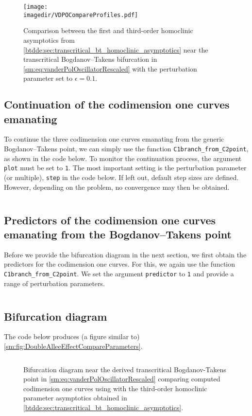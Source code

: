 \begin{figure}[ht]
    \centering
    \texttt{[image: \\imagedir/VDPOCompareProfiles.pdf]}
    \caption{Comparison between the first and third-order homoclinic asymptotics from
    \cref{btdde:sec:transcritical_bt_homoclinic_asymptotics} near the transcritical
        Bogdanov--Takens bifurcation in \cref{sm:eq:vanderPolOscillatorRescaled} with the
        perturbation parameter set to $\epsilon=0.1$.}
    \label{sm:fig:VDPOCompareProfiles}
\end{figure}

\subsection{Continuation of the codimension one curves emanating}
To continue the three codimension one curves emanating from the generic
Bogdanov--Takens point, we can simply use the function
\texttt{C1branch_from_C2point}, as shown in the code below. To monitor the
continuation process, the argument \texttt{plot} must be set to \texttt{1}.
The most important setting is the perturbation parameter (or multiple),
\texttt{step} in the code below. If left out, default step sizes are defined.
However, depending on the problem, no convergence may then be obtained.
\inputminted[firstline=89, lastline=113]{MATLAB}{\pathToDDEBifToolDemos/vdpo_bt_transcritical/vanderPolOscillator.m}

\subsection{Predictors of the codimension one curves emanating from the Bogdanov--Takens point}
Before we provide the bifurcation diagram in the next section, we first obtain the predictors
for the codimension one curves. For this, we again use the function
\texttt{C1branch_from_C2point}. We set the argument \texttt{predictor} to \texttt{1}
and provide a range of perturbation parameters.
\inputminted[firstline=135, lastline=154]{MATLAB}{\pathToDDEBifToolDemos/vdpo_bt_transcritical/vanderPolOscillator.m}

\subsection{Bifurcation diagram}
The code below produces (a figure similar to) \cref{sm:fig:DoubleAlleeEffectCompareParameters}.
\inputminted[firstline=156, lastline=182]{MATLAB}{\pathToDDEBifToolDemos/vdpo_bt_transcritical/vanderPolOscillator.m}
%
\begin{figure}[ht]
    \centering
    \caption{Bifurcation diagram near the derived transcritical Bogdanov-Takens point in
        \cref{sm:eq:vanderPolOscillatorRescaled} comparing computed codimension one curves using
        \DDEBIFTOOL with the third-order homoclinic parameter asymptotics obtained
        in \cref{btdde:sec:transcritical_bt_homoclinic_asymptotics}.}
    \label{sm:fig:VDPOCompareParameters}
\end{figure}

